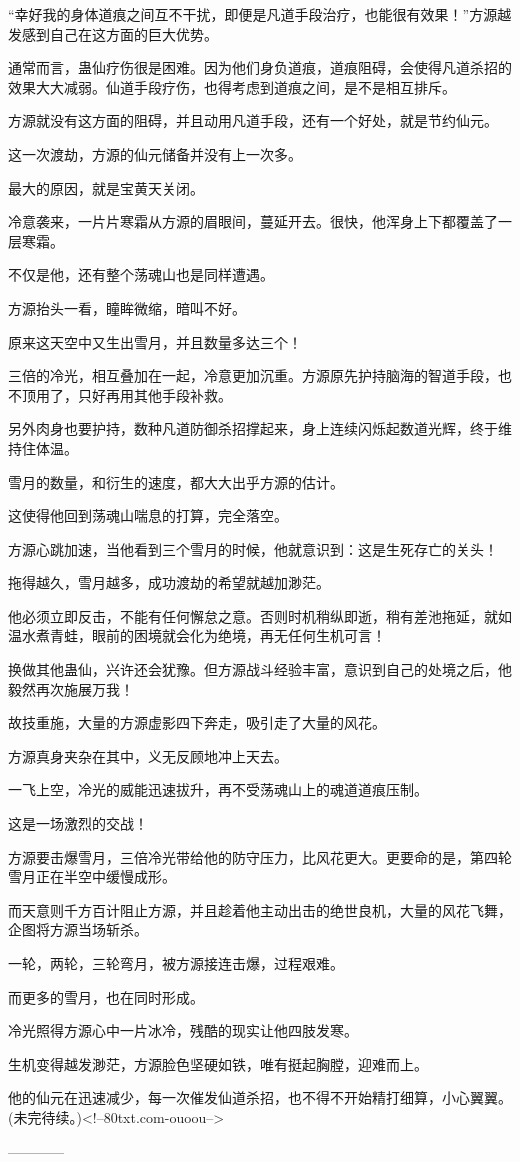 \begin{this_body}
“幸好我的身体道痕之间互不干扰，即便是凡道手段治疗，也能很有效果！”方源越发感到自己在这方面的巨大优势。

通常而言，蛊仙疗伤很是困难。因为他们身负道痕，道痕阻碍，会使得凡道杀招的效果大大减弱。仙道手段疗伤，也得考虑到道痕之间，是不是相互排斥。

方源就没有这方面的阻碍，并且动用凡道手段，还有一个好处，就是节约仙元。

这一次渡劫，方源的仙元储备并没有上一次多。

最大的原因，就是宝黄天关闭。

冷意袭来，一片片寒霜从方源的眉眼间，蔓延开去。很快，他浑身上下都覆盖了一层寒霜。

不仅是他，还有整个荡魂山也是同样遭遇。

方源抬头一看，瞳眸微缩，暗叫不好。

原来这天空中又生出雪月，并且数量多达三个！

三倍的冷光，相互叠加在一起，冷意更加沉重。方源原先护持脑海的智道手段，也不顶用了，只好再用其他手段补救。

另外肉身也要护持，数种凡道防御杀招撑起来，身上连续闪烁起数道光辉，终于维持住体温。

雪月的数量，和衍生的速度，都大大出乎方源的估计。

这使得他回到荡魂山喘息的打算，完全落空。

方源心跳加速，当他看到三个雪月的时候，他就意识到：这是生死存亡的关头！

拖得越久，雪月越多，成功渡劫的希望就越加渺茫。

他必须立即反击，不能有任何懈怠之意。否则时机稍纵即逝，稍有差池拖延，就如温水煮青蛙，眼前的困境就会化为绝境，再无任何生机可言！

换做其他蛊仙，兴许还会犹豫。但方源战斗经验丰富，意识到自己的处境之后，他毅然再次施展万我！

故技重施，大量的方源虚影四下奔走，吸引走了大量的风花。

方源真身夹杂在其中，义无反顾地冲上天去。

一飞上空，冷光的威能迅速拔升，再不受荡魂山上的魂道道痕压制。

这是一场激烈的交战！

方源要击爆雪月，三倍冷光带给他的防守压力，比风花更大。更要命的是，第四轮雪月正在半空中缓慢成形。

而天意则千方百计阻止方源，并且趁着他主动出击的绝世良机，大量的风花飞舞，企图将方源当场斩杀。

一轮，两轮，三轮弯月，被方源接连击爆，过程艰难。

而更多的雪月，也在同时形成。

冷光照得方源心中一片冰冷，残酷的现实让他四肢发寒。

生机变得越发渺茫，方源脸色坚硬如铁，唯有挺起胸膛，迎难而上。

他的仙元在迅速减少，每一次催发仙道杀招，也不得不开始精打细算，小心翼翼。(未完待续。)<!--80txt.com-ouoou-->

------------

\end{this_body}

